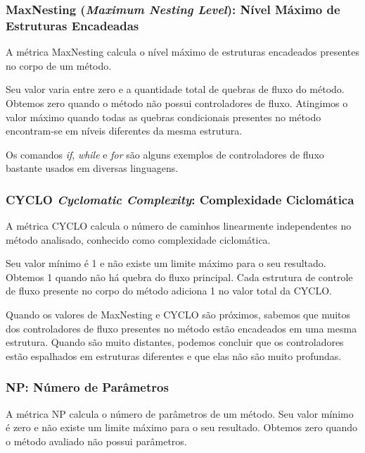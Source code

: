 \subsubsection{MaxNesting (\textit{Maximum Nesting Level}): Nível Máximo de Estruturas Encadeadas}

A métrica MaxNesting \citep{Lanza06} calcula o nível máximo de estruturas encadeados presentes no corpo de um método.

Seu valor varia entre zero e a quantidade total de quebras de fluxo do método. Obtemos zero quando o método não possui controladores de fluxo. Atingimos o valor máximo quando todas as quebras condicionais presentes no método encontram-se em níveis diferentes da mesma estrutura.

Os comandos \textit{if}, \textit{while} e \textit{for} são alguns exemplos de controladores de fluxo bastante usados em diversas linguagens.
                         

\subsubsection{CYCLO \textit{Cyclomatic Complexity}: Complexidade Ciclomática}

A métrica CYCLO \citep{McCabe76} calcula o número de caminhos linearmente independentes no método analisado, conhecido como complexidade ciclomática.

Seu valor mínimo é 1 e não existe um limite máximo para o seu resultado. Obtemos 1 quando não há quebra do fluxo principal. Cada estrutura de controle de fluxo presente no corpo do método adiciona 1 no valor total da CYCLO.
	                          
Quando os valores de MaxNesting e CYCLO são próximos, sabemos que muitos dos controladores de fluxo presentes no método estão encadeados em uma mesma estrutura. Quando são muito distantes, podemos concluir que os controladores estão espalhados em estruturas diferentes e que elas não são muito profundas.
                                   

\subsubsection{NP: Número de Parâmetros}

A métrica NP calcula o número de parâmetros de um método. Seu valor mínimo é zero e não existe um limite máximo para o seu resultado. Obtemos zero quando o método avaliado não possui parâmetros.
                                                             
